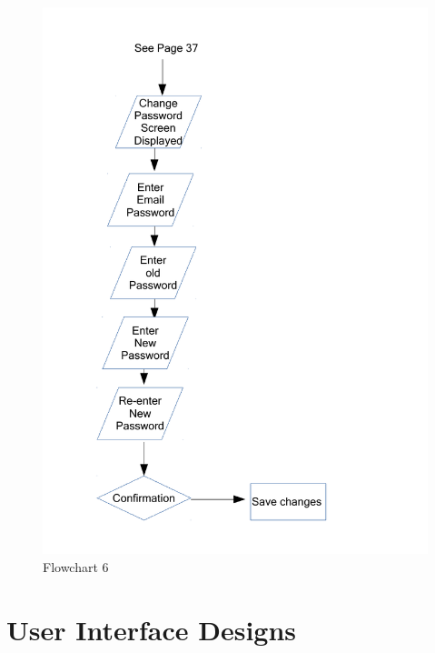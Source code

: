 \begin{figure}[H]
    \caption{Flowchart 6} \label{Flowchart_6.pdf}
    \includegraphics[width=\textwidth]{./Design/Flowcharts/Flowchart_6.pdf}
\end{figure}


\section{User Interface Designs}

